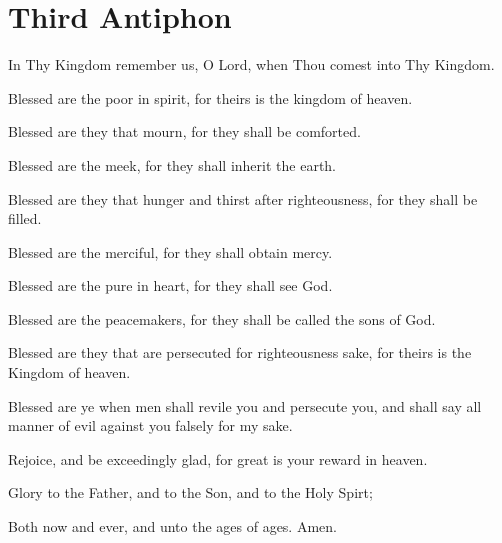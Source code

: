 \section{Third Antiphon}

\begin{liturgicaltext}
    \choir In Thy Kingdom remember us, O Lord, when Thou comest into Thy Kingdom.
    \item[] Blessed are the poor in spirit, for theirs is the kingdom of heaven.
    \item[] Blessed are they that mourn, for they shall be comforted.
    \item[] Blessed are the meek, for they shall inherit the earth.
    \item[] Blessed are they that hunger and thirst after righteousness, for they shall be filled.
    \item[] Blessed are the merciful, for they shall obtain mercy.
    \item[] Blessed are the pure in heart, for they shall see God.
    \item[] Blessed are the peacemakers, for they shall be called the sons of God.
    \item[] Blessed are they that are persecuted for righteousness sake, for theirs is the Kingdom of heaven.
    \item[] Blessed are ye when men shall revile you and persecute you, and shall say all manner of evil against you falsely for my sake.
    \item[] Rejoice, and be exceedingly glad, for great is your reward in heaven.
    \item[] Glory to the Father, and to the Son, and to the Holy Spirt;
    \item[] Both now and ever, and unto the ages of ages. Amen.
\end{liturgicaltext}

